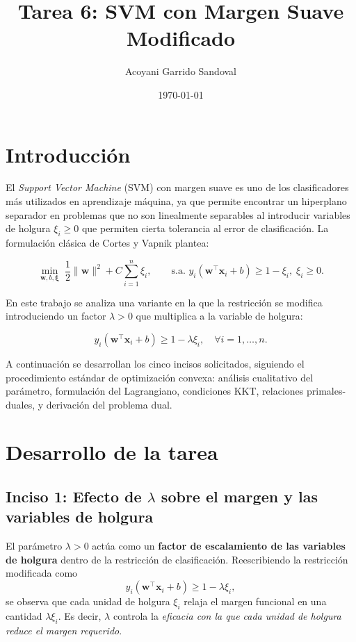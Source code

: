 \documentclass[spanish]{article}
\begin{document}
\title{Tarea 6: SVM con Margen Suave Modificado}
\author{Acoyani Garrido Sandoval}
\date{\today}
\maketitle

\section{Introducción}

El \emph{Support Vector Machine} (SVM) con margen suave es uno de los clasificadores más utilizados en aprendizaje máquina, ya que permite encontrar un hiperplano separador en problemas que no son linealmente separables al introducir variables de holgura $\xi_i \geq 0$ que permiten cierta tolerancia al error de clasificación. La formulación clásica de Cortes y Vapnik plantea:

\begin{equation*}
\min_{\mathbf{w}, b, \boldsymbol{\xi}} \; \frac{1}{2}\|\mathbf{w}\|^2 + C\sum_{i=1}^{n}\xi_i, \qquad \text{s.a. } y_i(\mathbf{w}^\top \mathbf{x}_i + b) \geq 1 - \xi_i,\; \xi_i \geq 0.
\end{equation*}

En este trabajo se analiza una variante en la que la restricción se modifica introduciendo un factor $\lambda > 0$ que multiplica a la variable de holgura:

\begin{equation*}
y_i\!\left(\mathbf{w}^\top \mathbf{x}_i + b\right) \geq 1 - \lambda \xi_i, \quad \forall i = 1, \dots, n.
\end{equation*}

A continuación se desarrollan los cinco incisos solicitados, siguiendo el procedimiento estándar de optimización convexa: análisis cualitativo del parámetro, formulación del Lagrangiano, condiciones KKT, relaciones primales-duales, y derivación del problema dual.

\section{Desarrollo de la tarea}

\subsection{Inciso 1: Efecto de $\lambda$ sobre el margen y las variables de holgura}

El parámetro $\lambda > 0$ actúa como un \textbf{factor de escalamiento de las variables de holgura} dentro de la restricción de clasificación. Reescribiendo la restricción modificada como
\[
y_i(\mathbf{w}^\top \mathbf{x}_i + b) \geq 1 - \lambda \xi_i,
\]
se observa que cada unidad de holgura $\xi_i$ relaja el margen funcional en una cantidad $\lambda \xi_i$. Es decir, $\lambda$ controla la \emph{eficacia con la que cada unidad de holgura reduce el margen requerido}.
\end{document}
